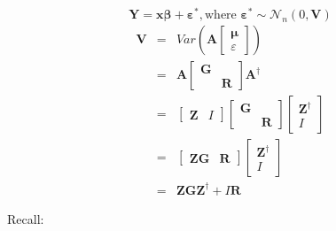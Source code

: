\documentclass{article}
\begin{document}
\begin{equation*}
\mathbf{Y}=\mathbf{x\beta }+\mathbf{\varepsilon }^{\ast }\mathbf{,}\text{
where }\mathbf{\varepsilon }^{\ast }\sim \mathcal{N}_{n}\left( 0,\mathbf{V}%
\right) 
\end{equation*}%
\begin{eqnarray*}
\mathbf{V} &=&Var\left( \mathbf{A}\left[ 
\begin{array}{c}
\mathbf{\mu } \\ 
\varepsilon 
\end{array}%
\right] \right)  \\
&=&\mathbf{A}\left[ 
\begin{array}{cc}
\mathbf{G} &  \\ 
& \mathbf{R}%
\end{array}%
\right] \mathbf{A}^{\dagger } \\
&=&\left[ 
\begin{array}{cc}
\mathbf{Z} & I%
\end{array}%
\right] \left[ 
\begin{array}{cc}
\mathbf{G} &  \\ 
& \mathbf{R}%
\end{array}%
\right] \left[ 
\begin{array}{c}
\mathbf{Z}^{\dagger } \\ 
I%
\end{array}%
\right]  \\
&=&\left[ 
\begin{array}{cc}
\mathbf{ZG} & \mathbf{R}%
\end{array}%
\right] \left[ 
\begin{array}{c}
\mathbf{Z}^{\dagger } \\ 
I%
\end{array}%
\right]  \\
&=&\mathbf{ZGZ}^{\dagger }+I\mathbf{R}
\end{eqnarray*}

\bigskip 

Recall: 
\end{document}
